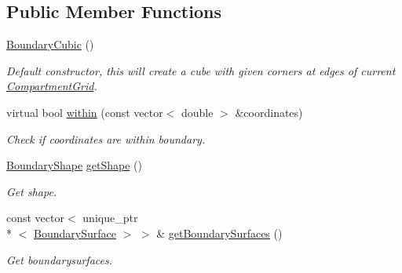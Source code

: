 \subsection*{Public Member Functions}
\begin{DoxyCompactItemize}
\item 
\hyperlink{classBoundaryCubic_abba330bb75d623c8fa0884eeea937e63}{Boundary\+Cubic} ()
\begin{DoxyCompactList}\small\item\em Default constructor, this will create a cube with given corners at edges of current \hyperlink{classCompartmentGrid}{Compartment\+Grid}. \end{DoxyCompactList}\item 
virtual bool \hyperlink{classBoundaryCubic_a07b7fc5d0d09b0ce39e92e6b4bd2a7a4}{within} (const vector$<$ double $>$ \&coordinates)
\begin{DoxyCompactList}\small\item\em Check if coordinates are within boundary. \end{DoxyCompactList}\item 
\hyperlink{Boundary_8h_a0099b369f2bc119c1b54728734b41132}{Boundary\+Shape} \hyperlink{classBoundary_a20d2121527b207eed35f6719393e3499}{get\+Shape} ()
\begin{DoxyCompactList}\small\item\em Get shape. \end{DoxyCompactList}\item 
const vector$<$ unique\+\_\+ptr\\*
$<$ \hyperlink{classBoundarySurface}{Boundary\+Surface} $>$ $>$ \& \hyperlink{classBoundary_acfa6640f65c432e339108887913539eb}{get\+Boundary\+Surfaces} ()
\begin{DoxyCompactList}\small\item\em Get boundarysurfaces. \end{DoxyCompactList}\end{DoxyCompactItemize}
